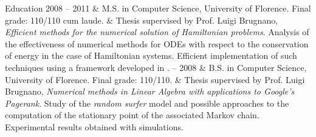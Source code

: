 \begin{cvsection}{Education}
2008 -- 2011 & M.S. in Computer Science, University of Florence. Final grade: 110/110 cum laude.\spacednewline
	& Thesis supervised by Prof. Luigi Brugnano, \emph{Efficient methods for the numerical solution of Hamiltonian problems}.
	Analysis of the effectiveness of numerical methods for ODEs with respect to the conservation of energy in the case of Hamiltonian systems. Efficient implementation of such techniques using a framework developed in . -- 2008 & B.S. in Computer Science, University of Florence. Final grade: 110/110.\spacednewline
	& Thesis supervised by Prof. Luigi Brugnano, \emph{Numerical methods in Linear Algebra with applications to Google's Pagerank}. Study of the \emph{random surfer} model and possible approaches to the computation of the stationary point of the associated Markov chain. Experimental results obtained with  simulations.
\end{cvsection}